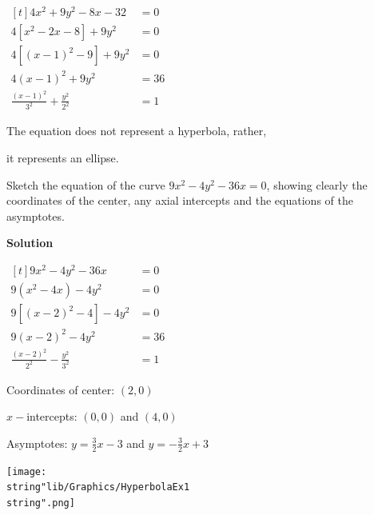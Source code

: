 \documentclass[11pt,a4paper]{book}
\begin{document}
\begin{example}{}
\begin{enumerate}[label=(\alph*)]
\begin{minipage}[t]{0.36\textwidth}

$
\begin{aligned}[t]
4x^{2}+9y^{2}-8x-32 & =0\\
4\left[x^{2}-2x-8\right]+9y^{2} & =0\\
4\left[\left(x-1\right)^{2}-9\right]+9y^{2} & =0\\
4\left(x-1\right)^{2}+9y^{2} & =36\\
\frac{\left(x-1\right)^{2}}{3^{2}}+\frac{y^{2}}{2^{2}} & =1
\end{aligned}
$

\end{minipage}
\begin{minipage}[t]{0.6\textwidth}

The equation does not represent a hyperbola, rather,

it represents an ellipse.

\end{minipage}

\end{enumerate}


\end{example}

\newpage

\begin{example}{}
Sketch the equation of the curve $9x^{2}-4y^{2}-36x=0$, showing clearly
the coordinates of the center, any axial intercepts and the equations
of the asymptotes.

\textbf{Solution}

\begin{minipage}[t]{0.5\textwidth}

$
\begin{aligned}[t]
9x^{2}-4y^{2}-36x & =0\\
9\left(x^{2}-4x\right)-4y^{2} & =0\\
9\left[\left(x-2\right)^{2}-4\right]-4y^{2} & =0\\
9\left(x-2\right)^{2}-4y^{2} & =36\\
\frac{\left(x-2\right)^{2}}{2^{2}}-\frac{y^{2}}{3^{2}} & =1
\end{aligned}
$

Coordinates of center: $\left(2,0\right)$

$x-$intercepts: $\left(0,0\right)$ and $\left(4,0\right)$

Asymptotes: ${\displaystyle y=\frac{3}{2}x-3}$ and ${\displaystyle y=-\frac{3}{2}x+3}$

\end{minipage}
\begin{minipage}[t]{0.5\textwidth}
\begin{center}
\texttt{[image: \\string"lib/Graphics/HyperbolaEx1\\string".png]}
\par\end{center}

\end{minipage}
\end{example}
\end{document}

